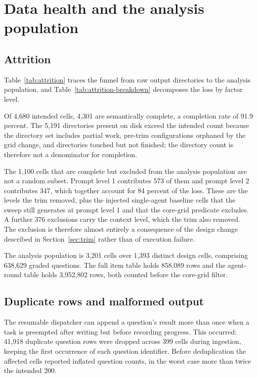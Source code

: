 \section{Data health and the analysis population}
\label{sec:health}

\subsection{Attrition}

Table~\ref{tab:attrition} traces the funnel from raw output directories to the analysis
population, and Table~\ref{tab:attrition-breakdown} decomposes the loss by factor level.


Of 4{,}680 intended cells, 4{,}301 are semantically complete, a completion rate of 91.9
percent. The 5{,}191 directories present on disk exceed the intended count because the
directory set includes partial work, pre-trim configurations orphaned by the grid change,
and directories touched but not finished; the directory count is therefore not a
denominator for completion.


The 1{,}100 cells that are complete but excluded from the analysis population are not a
random subset. Prompt level 1 contributes 573 of them and prompt level 2 contributes 347,
which together account for 84 percent of the loss. These are the levels the trim removed,
plus the injected single-agent baseline cells that the sweep still generates at prompt
level 1 and that the core-grid predicate excludes. A further 376 exclusions carry the
 context level, which the trim also removed. The exclusion is
therefore almost entirely a consequence of the design change described in
Section~\ref{sec:trim} rather than of execution failure.

The analysis population is 3{,}201 cells over 1{,}393 distinct design cells, comprising
638{,}629 graded questions. The full item table holds 858{,}089 rows and the agent-round
table holds 3{,}952{,}802 rows, both counted before the core-grid filter.

\subsection{Duplicate rows and malformed output}

The resumable dispatcher can append a question's result more than once when a task is
preempted after writing but before recording progress. This occurred: 41{,}918 duplicate
question rows were dropped across 399 cells during ingestion, keeping the first occurrence
of each question identifier. Before deduplication the affected cells reported inflated
question counts, in the worst case more than twice the intended 200.

